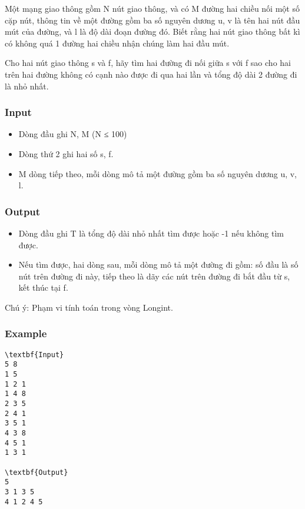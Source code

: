 

Một mạng giao thông gồm N nút giao thông, và có M đường hai chiều nối một số cặp nút, thông tin về một đường gồm ba số nguyên dương u, v là tên hai nút đầu mút của đường, và l là độ dài đoạn đường đó. Biết rằng hai nút giao thông bất kì có không quá 1 đường hai chiều nhận chúng làm hai đầu mút.


Cho hai nút giao thông s và f, hãy tìm hai đường đi nối giữa s với f sao cho hai trên hai đường không có cạnh nào được đi qua hai lần và tổng độ dài 2 đường đi là nhỏ nhất.

\subsubsection{Input}
\begin{itemize}
	\item Dòng đầu ghi N, M (N ≤ 100)
	\item Dòng thứ 2 ghi hai số s, f.
	\item M dòng tiếp theo, mỗi dòng mô tả một đường gồm ba số nguyên dương u, v, l.
\end{itemize}

\subsubsection{Output}
\begin{itemize}
	\item Dòng đầu ghi T là tổng độ dài nhỏ nhất tìm được hoặc -1 nếu không tìm được.
	\item Nếu tìm được, hai dòng sau, mỗi dòng mô tả một đường đi gồm: số đầu là số nút trên đường đi này, tiếp theo là dãy các nút trên đường đi bắt đầu từ s, kết thúc tại f.
\end{itemize}

Chú ý: Phạm vi tính toán trong vòng Longint.

\subsubsection{Example}
\begin{verbatim}
\textbf{Input}
5 8
1 5
1 2 1
1 4 8
2 3 5
2 4 1
3 5 1
4 3 8
4 5 1
1 3 1

\textbf{Output}
5
3 1 3 5 
4 1 2 4 5
\end{verbatim}
